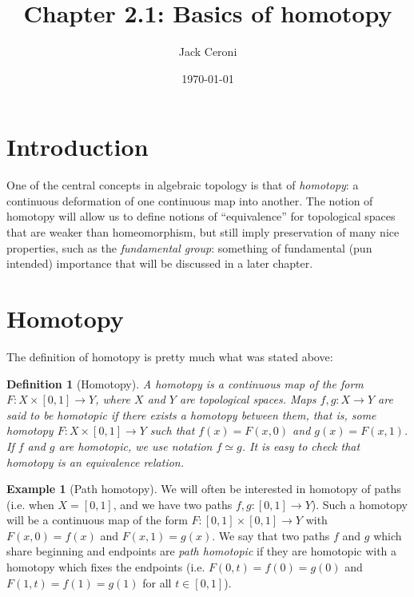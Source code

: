 \documentclass[10pt, oneside]{amsart}
\title{Chapter 2.1: Basics of homotopy}
\author{Jack Ceroni}
\date{\today}
\newtheorem{definition}{Definition}
\theoremstyle{definition}
\newtheorem{example}{Example}
\begin{document}
\maketitle

\tableofcontents

\section{Introduction}

\noindent One of the central concepts in algebraic topology is that of \emph{homotopy}: a continuous deformation of one continuous map into another.
The notion of homotopy will allow us to define notions of ``equivalence'' for topological spaces that are weaker than homeomorphism, but still
imply preservation of many nice properties, such as the \emph{fundamental group}: something of fundamental (pun intended) importance that will be discussed
in a later chapter.

\section{Homotopy}

\noindent The definition of homotopy is pretty much what was stated above:

\begin{definition}[Homotopy]
  A homotopy is a continuous map of the form $F : X \times [0, 1] \rightarrow Y$, where $X$ and $Y$ are topological spaces. Maps $f, g : X \rightarrow Y$
  are said to be \emph{homotopic} if there exists a homotopy between them, that is, some homotopy $F : X \times [0, 1] \rightarrow Y$ such that $f(x) = F(x, 0)$
  and $g(x) = F(x, 1)$. If $f$ and $g$ are homotopic, we use notation $f \simeq g$. It is easy to check that homotopy is an equivalence relation.
\end{definition}

\begin{example}[Path homotopy]
  We will often be interested in homotopy of paths (i.e. when $X = [0, 1]$, and we have two paths $f, g : [0, 1] \rightarrow Y$). Such a homotopy
  will be a continuous map of the form $F : [0, 1] \times [0, 1] \rightarrow Y$ with $F(x, 0) = f(x)$ and $F(x, 1) = g(x)$. We say that
  two paths $f$ and $g$ which share beginning and endpoints are \emph{path homotopic} if they are homotopic with a homotopy which fixes the endpoints
  (i.e. $F(0, t) = f(0) = g(0)$ and $F(1, t) = f(1) = g(1)$ for all $t \in [0, 1]$).
\end{example}
\end{document}
